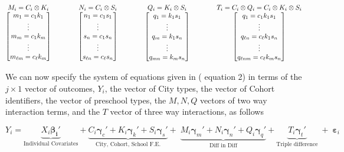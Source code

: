 \documentclass[10pt]{article}
\begin{document}
\begin{equation*}
\underset{\begin{bmatrix} m_1 = c_1 k_1 \\
\vdots  \\
m_m = c_1 k_m  \\
\vdots  \\
m_{\ell m} = c_{\ell} k_m 
\end{bmatrix}}{M_i = C_i \otimes K_i  } \qquad \qquad
 \underset{\begin{bmatrix} n_1 = c_1 s_1 \\
\vdots  \\
s_n = c_1 s_n  \\
\vdots  \\
s_{\ell n} = c_{\ell} s_n 
\end{bmatrix}}{N_i = C_i \otimes S_i} \qquad \qquad
\underset{\begin{bmatrix} q_1 = k_1 s_1 \\
\vdots  \\
q_m = k_1 s_n  \\
\vdots  \\
q_{m n} = k_{m} s_n 
\end{bmatrix}}{Q_i = K_i \otimes S_i } \qquad \qquad
\underset{\begin{bmatrix} q_1 = c_1 k_1 s_1  \\
\vdots  \\
q_{\ell n} = c_{\ell} k_1 s_n  \\
\vdots  \\
q_{\ell n m} = c_{\ell} k_m s_n  \\
\end{bmatrix}}{T_i = C_i \otimes Q_i \\
= C_i \otimes K_i \otimes S_i }
\end{equation*}


We can now specify the system of equations given in ( equation 2) in terms of the $j \times 1$ vector of outcomes, $Y_i$, the vector of City types, the vector of Cohort identifiers, the vector of preschool types, the $M,N,Q$ vectors of two way interaction terms, and the $T$ vector of three way interactions, as follows

\begin{equation} \label{diffs}
Y_i = \underbrace{X_i \boldsymbol{\beta_i}'}_{\text{Individual Covariates}} + \underbrace{C_i \boldsymbol{\gamma}_c' + K_i \boldsymbol{\gamma}_k' + S_i \boldsymbol{\gamma}_s'}_{\text{City, Cohort, School F.E.}}  +\; \underbrace{M_i \boldsymbol{\gamma}_m' + N_i \boldsymbol{\gamma}_n' + Q_i \boldsymbol{\gamma}_q'}_{\text{Diff in Diff}} + \underbrace{T_i \boldsymbol{\gamma}_t'}_{\text{Triple difference}} \; + \; \boldsymbol{\varepsilon}_{i}
\end{equation}
\end{document}

